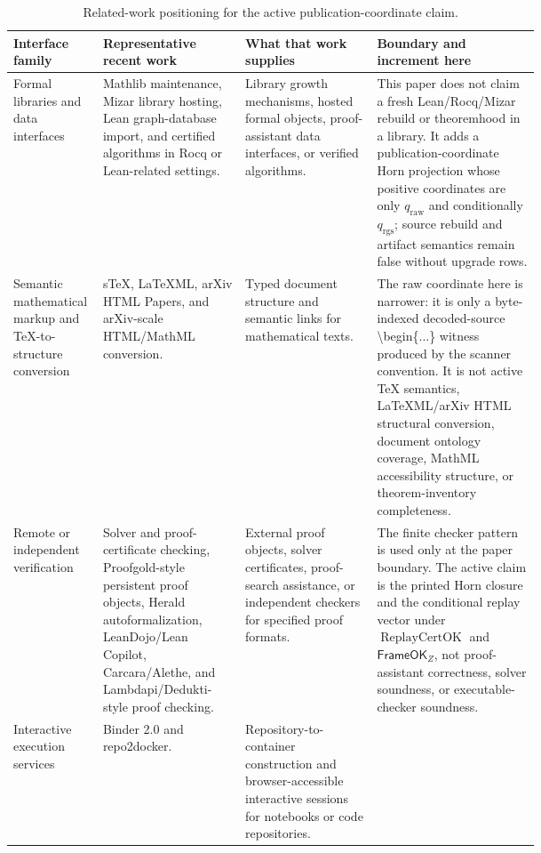 \documentclass[runningheads]{llncs}
\DeclareRobustCommand{\auditbegintoken}{\mbox{\normalfont\ttfamily\textbackslash{}begin\{...\}}}
\newcommand{\FrameOKZ}{\mathsf{FrameOK}_{Z}}
\newcommand{\rawBeginTokenCoord}{q_{\mathrm{raw}}}
\newcommand{\qlex}{\rawBeginTokenCoord}
\newcommand{\qrgs}{q_{\mathrm{rgs}}}
\begin{document}
\begin{table}
\caption{Related-work positioning for the active publication-coordinate claim.}
\label{tab:active-related-work-comparison}
\tiny
\setlength{\tabcolsep}{1.5pt}
\renewcommand{\arraystretch}{0.88}
\begin{tabularx}{\linewidth}{@{}L{0.17\linewidth}L{0.27\linewidth}L{0.25\linewidth}Y@{}}
\toprule
Interface family & Representative recent work & What that work supplies & Boundary and increment here \\
\midrule
Formal libraries and data interfaces &
Mathlib maintenance, Mizar library hosting, Lean graph-database import, and
certified algorithms in Rocq or Lean-related settings. &
Library growth mechanisms, hosted formal objects, proof-assistant data
interfaces, or verified algorithms. &
This paper does not claim a fresh Lean/Rocq/Mizar rebuild or theoremhood in a
library.  It adds a publication-coordinate Horn projection whose positive
coordinates are only \(\qlex\) and conditionally \(\qrgs\); source rebuild and
artifact semantics remain false without upgrade rows. \\
\addlinespace
Semantic mathematical markup and \TeX{}-to-structure conversion &
sTeX, LaTeXML, arXiv HTML Papers, and arXiv-scale HTML/MathML conversion. &
Typed document structure and semantic links for mathematical texts. &
The raw coordinate here is narrower: it is only a byte-indexed decoded-source
\auditbegintoken{} witness produced by the scanner convention.  It is not active
\TeX{} semantics, LaTeXML/arXiv HTML structural conversion, document ontology
coverage, MathML accessibility structure, or theorem-inventory completeness. \\
\addlinespace
Remote or independent verification &
Solver and proof-certificate checking, Proofgold-style persistent proof objects,
Herald autoformalization, LeanDojo/Lean Copilot, Carcara/Alethe, and
Lambdapi/Dedukti-style proof checking. &
External proof objects, solver certificates, proof-search assistance, or
independent checkers for specified proof formats. &
The finite checker pattern is used only at the paper boundary.  The active claim
is the printed Horn closure and the conditional replay vector under
\(\operatorname{ReplayCertOK}\) and \(\FrameOKZ\), not proof-assistant
correctness, solver soundness, or executable-checker soundness. \\
\addlinespace
Interactive execution services &
Binder 2.0 and repo2docker. &
Repository-to-container construction and browser-accessible interactive sessions
for notebooks or code repositories. &

\end{tabularx}
\end{table}
\end{document}
